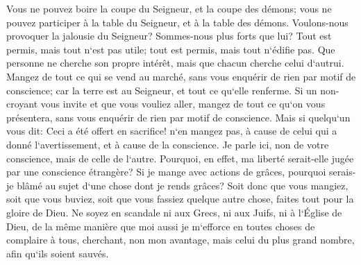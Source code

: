 \verse Vous ne pouvez boire la coupe du Seigneur, et la coupe des démons; vous ne pouvez participer à la table du Seigneur, et à la table des démons. 
\verse Voulons-nous provoquer la jalousie du Seigneur? Sommes-nous plus forts que lui? 
\verse Tout est permis, mais tout n`est pas utile; tout est permis, mais tout n`édifie pas. 
\verse Que personne ne cherche son propre intérêt, mais que chacun cherche celui d`autrui. 
\verse Mangez de tout ce qui se vend au marché, sans vous enquérir de rien par motif de conscience; 
\verse car la terre est au Seigneur, et tout ce qu`elle renferme. 
\verse Si un non-croyant vous invite et que vous vouliez aller, mangez de tout ce qu`on vous présentera, sans vous enquérir de rien par motif de conscience. 
\verse Mais si quelqu`un vous dit: Ceci a été offert en sacrifice! n`en mangez pas, à cause de celui qui a donné l`avertissement, et à cause de la conscience. 
\verse Je parle ici, non de votre conscience, mais de celle de l`autre. Pourquoi, en effet, ma liberté serait-elle jugée par une conscience étrangère? 
\verse Si je mange avec actions de grâces, pourquoi serais-je blâmé au sujet d`une chose dont je rends grâces? 
\verse Soit donc que vous mangiez, soit que vous buviez, soit que vous fassiez quelque autre chose, faites tout pour la gloire de Dieu. 
\verse Ne soyez en scandale ni aux Grecs, ni aux Juifs, ni à l`Église de Dieu, 
\verse de la même manière que moi aussi je m`efforce en toutes choses de complaire à tous, cherchant, non mon avantage, mais celui du plus grand nombre, afin qu`ils soient sauvés. 

